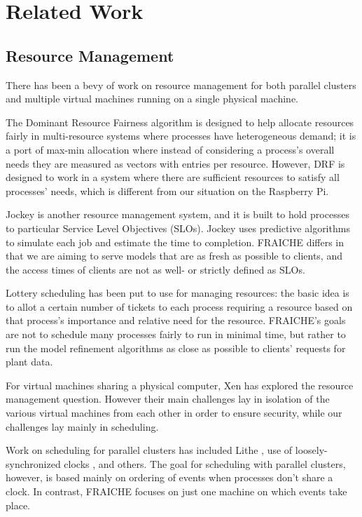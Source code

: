 \documentclass[a4paper]{article}
\begin{document}
\section{Related Work}

\subsection{Resource Management}

There has been a bevy of work on resource management for both parallel clusters and multiple virtual machines running on a single physical machine.

The Dominant Resource Fairness algorithm \cite{} is designed to help allocate resources fairly in multi-resource systems where processes have heterogeneous demand; it is a port of max-min allocation \cite{} where instead of considering a process's overall needs they are measured as vectors with entries per resource.  However, DRF is designed to work in a system where there are sufficient resources to satisfy all processes' needs, which is different from our situation on the Raspberry Pi.

Jockey \cite{} is another resource management system, and it is built to hold processes to particular Service Level Objectives (SLOs).  Jockey uses predictive algorithms to simulate each job and estimate the time to completion.  FRAICHE differs in that we are aiming to serve models that are as fresh as possible to clients, and the access times of clients are not as well- or strictly defined as SLOs.

Lottery scheduling has been put to use for managing resources: the basic idea is to allot a certain number of tickets to each process requiring a resource based on that process's importance and relative need for the resource.  FRAICHE's goals are not to schedule many processes fairly to run in minimal time, but rather to run the model refinement algorithms as close as possible to clients' requests for plant data.

For virtual machines sharing a physical computer, Xen has explored the resource management question.  However their main challenges lay in isolation of the various virtual machines from each other in order to ensure security, while our challenges lay mainly in scheduling.

Work on scheduling for parallel clusters has included Lithe \cite{}, use of loosely-synchronized clocks \cite{}, and others.  The goal for scheduling with parallel clusters, however, is based mainly on ordering of events when processes don't share a clock.  In contrast, FRAICHE focuses on just one machine on which events take place.
\end{document}

